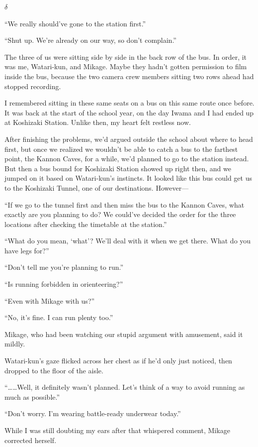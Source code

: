 \documentclass[
    a4paper,
    12pt,
    twoside,
    openany,
    UTF8,
    fontset=windows
]{ctexbook}
\begin{document}
$\delta$

``We really should've gone to the station first.''

``Shut up. We're already on our way, so don't complain.''

The three of us were sitting side by side in the back row of the bus. In order, it was me, Watari-kun, and Mikage. Maybe they hadn't gotten permission to film inside the bus, because the two camera crew members sitting two rows ahead had stopped recording.

I remembered sitting in these same seats on a bus on this same route once before. It was back at the start of the school year, on the day Iwama and I had ended up at Koshizaki Station. Unlike then, my heart felt restless now.

After finishing the problems, we'd argued outside the school about where to head first, but once we realized we wouldn't be able to catch a bus to the farthest point, the Kannon Caves, for a while, we'd planned to go to the station instead. But then a bus bound for Koshizaki Station showed up right then, and we jumped on it based on Watari-kun's instincts. It looked like this bus could get us to the Koshizaki Tunnel, one of our destinations. However---

``If we go to the tunnel first and then miss the bus to the Kannon Caves, what exactly are you planning to do? We could've decided the order for the three locations after checking the timetable at the station.''

``What do you mean, `what'? We'll deal with it when we get there. What do you have legs for?''

``Don't tell me you're planning to run.''

``Is running forbidden in orienteering?''

``Even with Mikage with us?''

``No, it's fine. I can run plenty too.''

Mikage, who had been watching our stupid argument with amusement, said it mildly.

Watari-kun's gaze flicked across her chest as if he'd only just noticed, then dropped to the floor of the aisle.

``\dots\dots Well, it definitely wasn't planned. Let's think of a way to avoid running as much as possible.''

``Don't worry. I'm wearing battle-ready underwear today.''

While I was still doubting my ears after that whispered comment, Mikage corrected herself.
\end{document}
